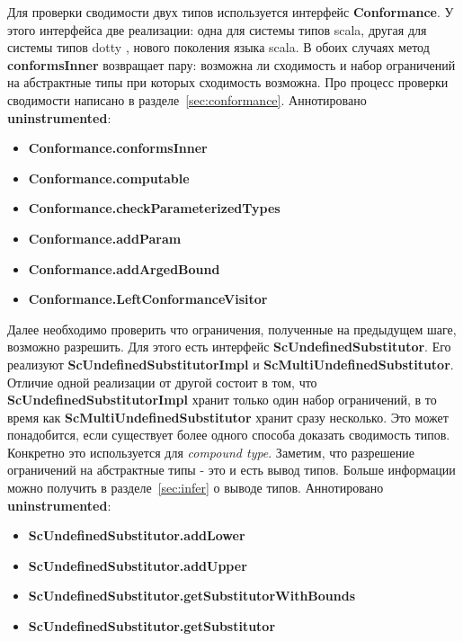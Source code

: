 Для проверки сводимости двух типов используется интерфейс \textbf{Conformance}.
У этого интерфейса две реализации: одна для системы типов scala, другая для
системы типов dotty \cite{dotty}, нового поколения языка scala.
В обоих случаях метод \textbf{conformsInner} возвращает пару: возможна ли
сходимость и набор ограничений на абстрактные типы при которых сходимость
возможна.
Про процесс проверки сводимости написано в разделе~\ref{sec:conformance}.
Аннотировано \textbf{uninstrumented}:
\begin{itemize}
  \item \textbf{Conformance.conformsInner}
  \item \textbf{Conformance.computable}
  \item \textbf{Conformance.checkParameterizedTypes}
  \item \textbf{Conformance.addParam}
  \item \textbf{Conformance.addArgedBound}
  \item \textbf{Conformance.LeftConformanceVisitor}
\end{itemize}

Далее необходимо проверить что ограничения, полученные на предыдущем шаге,
возможно разрешить.
Для этого есть интерфейс \textbf{ScUndefinedSubstitutor}.
Его реализуют \textbf{ScUndefinedSubstitutorImpl} и
\textbf{ScMultiUndefinedSubstitutor}.
Отличие одной реализации от другой состоит в том, что
\textbf{ScUndefinedSubstitutorImpl} хранит только один набор ограничений, в
то время как \textbf{ScMultiUndefinedSubstitutor} хранит сразу несколько.
Это может понадобится, если существует более одного способа доказать сводимость
типов. Конкретно это используется для \textit{compound type}.
Заметим, что разрешение ограничений на абстрактные типы - это и есть вывод типов.
Больше информации можно получить в разделе~\ref{sec:infer} о выводе типов.
Аннотировано \textbf{uninstrumented}:
\begin{itemize}
  \item \textbf{ScUndefinedSubstitutor.addLower}
  \item \textbf{ScUndefinedSubstitutor.addUpper}
  \item \textbf{ScUndefinedSubstitutor.getSubstitutorWithBounds}
  \item \textbf{ScUndefinedSubstitutor.getSubstitutor}
\end{itemize}

